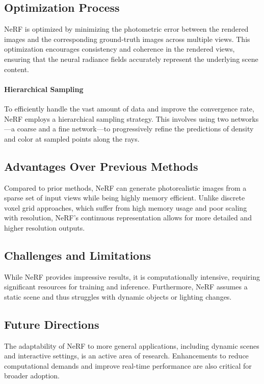 \subsection{Optimization Process}
NeRF is optimized by minimizing the photometric error between the rendered images and the corresponding ground-truth images across multiple views. This optimization encourages consistency and coherence in the rendered views, ensuring that the neural radiance fields accurately represent the underlying scene content.

\paragraph{Hierarchical Sampling}
To efficiently handle the vast amount of data and improve the convergence rate, NeRF employs a hierarchical sampling strategy. This involves using two networks—a coarse and a fine network—to progressively refine the predictions of density and color at sampled points along the rays.

\subsection*{Advantages Over Previous Methods}
Compared to prior methods, NeRF can generate photorealistic images from a sparse set of input views while being highly memory efficient. Unlike discrete voxel grid approaches, which suffer from high memory usage and poor scaling with resolution, NeRF’s continuous representation allows for more detailed and higher resolution outputs.

\subsection*{Challenges and Limitations}
While NeRF provides impressive results, it is computationally intensive, requiring significant resources for training and inference. Furthermore, NeRF assumes a static scene and thus struggles with dynamic objects or lighting changes.

\subsection*{Future Directions}
The adaptability of NeRF to more general applications, including dynamic scenes and interactive settings, is an active area of research. Enhancements to reduce computational demands and improve real-time performance are also critical for broader adoption.


